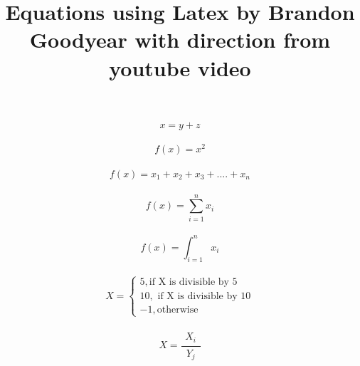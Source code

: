 \documentclass{article}
\begin{document}
\title{Equations using Latex by Brandon Goodyear with direction from youtube video}
\maketitle

\begin{equation}
x=y+z
\end{equation}\\
\begin{equation*}%
f(x)=x^2
\end{equation*}\\
\begin{equation}
f(x)=x_1+x_2+x_3+....+x_n
\end{equation}\\
\begin{equation}
f(x)=\sum_{i=1}^{n}{x_i}
\end{equation}\\
\begin{equation}
f(x)=\int_{i=1}^{n}{x_i}
\end{equation}\\
\begin{equation}
X=
\begin{cases}
5, \text{if X is divisible by 5}
\\
10,\text{ if X is divisible by 10}
\\
-1, \text{otherwise}
\end{cases}
\end{equation}\\
\begin{equation}
X=
\frac{\substack{X_i}}
{\substack{Y_j}}
\end{equation}%
\end{document}
